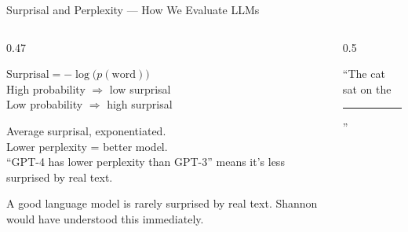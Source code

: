 \begin{frame}[shrink=18]{Surprisal and Perplexity --- How We Evaluate LLMs}

  \begin{columns}[T]
    \begin{column}{0.47\textwidth}
      \begin{tcolorbox}[colback=aiViolet!5, colframe=aiViolet!60,
        fonttitle=\bfseries\small, title={Surprisal},
        rounded corners, boxrule=0.5pt, left=3pt, right=3pt, top=3pt, bottom=3pt]
        \footnotesize
        $\text{Surprisal} = -\log\bigl(p(\text{word})\bigr)$\\[3pt]
        High probability \(\Rightarrow\) low surprisal\\
        Low probability \(\Rightarrow\) high surprisal
      \end{tcolorbox}

      \vspace{0.3em}
      \begin{tcolorbox}[colback=aiViolet!5, colframe=aiViolet!60,
        fonttitle=\bfseries\small, title={Perplexity},
        rounded corners, boxrule=0.5pt, left=3pt, right=3pt, top=3pt, bottom=3pt]
        \footnotesize
        Average surprisal, exponentiated.\\[3pt]
        Lower perplexity = better model.\\[3pt]
        {\scriptsize ``GPT-4 has lower perplexity than GPT-3'' means
        it's less surprised by real text.}
      \end{tcolorbox}

      \vspace{0.3em}
      \begin{insightbox}
        A good language model is rarely surprised by real text.
        Shannon would have understood this immediately.
      \end{insightbox}
    \end{column}

    \begin{column}{0.5\textwidth}
      {\footnotesize ``The cat sat on the \rule{0.8cm}{0.4pt}''}

      \vspace{0.4em}
\end{column}
\end{columns}
\end{frame}
